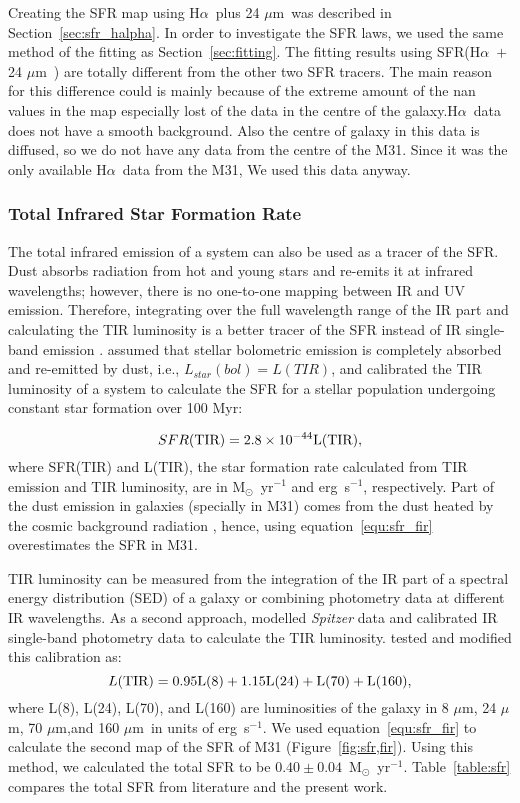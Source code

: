 \documentclass[useAMS,usenatbib]{mn2e}
\newcommand \halpha    {H$\alpha $\ }
\newcommand \um    {$\mu$m\ }
\newcommand \Spitzer {{\it Spitzer }}
\begin{document}
Creating the SFR map using \halpha plus 24 \um was described in Section~\ref{sec:sfr_halpha}. In order to investigate the SFR laws, we used the same method of the fitting as Section~\ref{sec:fitting}. The fitting results using SFR(\halpha $+$ 24 \um ) are totally different from the other two SFR tracers. The main reason for this difference could is mainly because of the extreme amount of the nan values in the map especially lost of the data in the centre of the galaxy.\halpha data does not have a smooth background. Also the centre of galaxy in this data is diffused, so we do not have any data from the centre of the M31. Since it was the only available \halpha data from the M31, We used this data anyway.

\subsubsection{Total Infrared Star Formation Rate}
\label{sec:sfr_fir}
The total infrared emission of a system can also be used as a tracer of the SFR. Dust absorbs radiation from hot and young stars and re-emits it at infrared wavelengths; however, there is no one-to-one mapping between IR and UV emission. Therefore, integrating over the full wavelength range of the IR part and calculating the TIR luminosity is a better tracer of the SFR instead of IR single-band emission \citep{Calzetti13}. \cite{Calzetti13} assumed that stellar bolometric emission is completely absorbed and re-emitted by dust, i.e., $L_{star}(bol) = L(TIR)$, and calibrated the TIR luminosity of a system to calculate the SFR for a stellar population undergoing constant star formation over 100 Myr:

\begin{equation}
\label{equ:sfr_fir}
SFR(\rm TIR) = 2.8 \times10^{-44}L(\rm TIR),
\end{equation}
where SFR(TIR) and L(TIR), the star formation rate calculated from TIR emission and TIR luminosity, are in M$_{\odot}$~yr$^{-1}$ and erg~s$^{-1}$, respectively. Part of the dust emission in galaxies (specially in M31) comes from the dust heated by the cosmic background radiation \citep[e.g.][]{Dole06, Calzetti13, Mattsson14}, hence, using equation~\ref{equ:sfr_fir} overestimates the SFR in M31.  

TIR luminosity can be measured from the integration of the IR part of a spectral energy distribution (SED) of a galaxy or combining photometry data at different IR wavelengths. As a second approach, \cite{Draine07} modelled \Spitzer data and calibrated IR single-band photometry data to calculate the TIR luminosity. \cite{Boquien10} tested and modified this calibration as:
\begin{equation}
 \label{equ: TIR}
L(\rm TIR) = 0.95L(8) + 1.15L(24) + L(70) + L(160),
\end{equation}
where L(8), L(24), L(70), and L(160) are luminosities of the galaxy in 8 $\mu$m, 24 $\mu$m, 70 $\mu$m,and 160 \um in units of erg~s$^{-1}$. We used equation~\ref{equ:sfr_fir} to calculate the second map of the SFR of M31 (Figure~\ref{fig:sfr,fir}). Using this method, we calculated the total SFR to be $0.40 \pm 0.04$~M$_{\odot}$~yr$^{-1}$. Table~\ref{table:sfr} compares the total SFR from literature and the present work. 
\end{document}
